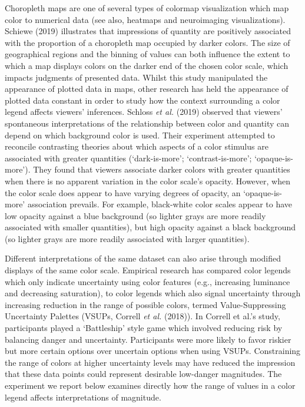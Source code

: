 \documentclass[
]{interact}
\begin{document}
Choropleth maps are one of several types of colormap visualization which
map color to numerical data (see also, heatmaps and neuroimaging
visualizations). Schiewe (2019) illustrates that impressions of quantity
are positively associated with the proportion of a choropleth map
occupied by darker colors. The size of geographical regions and the
binning of values can both influence the extent to which a map displays
colors on the darker end of the chosen color scale, which impacts
judgments of presented data. Whilst this study manipulated the
appearance of plotted data in maps, other research has held the
appearance of plotted data constant in order to study how the context
surrounding a color legend affects viewers' inferences. Schloss \emph{et
al.} (2019) observed that viewers' spontaneous interpretations of the
relationship between color and quantity can depend on which background
color is used. Their experiment attempted to reconcile contrasting
theories about which aspects of a color stimulus are associated with
greater quantities (`dark-is-more'; `contrast-is-more';
`opaque-is-more'). They found that viewers associate darker colors with
greater quantities when there is no apparent variation in the color
scale's opacity. However, when the color scale does appear to have
varying degrees of opacity, an `opaque-is-more' association prevails.
For example, black-white color scales appear to have low opacity against
a blue background (so lighter grays are more readily associated with
smaller quantities), but high opacity against a black background (so
lighter grays are more readily associated with larger quantities).

Different interpretations of the same dataset can also arise through
modified displays of the same color scale. Empirical research has
compared color legends which only indicate uncertainty using color
features (e.g., increasing luminance and decreasing saturation), to
color legends which also signal uncertainty through increasing reduction
in the range of possible colors, termed Value-Suppressing Uncertainty
Palettes (VSUPs, Correll \emph{et al.} (2018)). In Correll et al.'s
study, participants played a `Battleship' style game which involved
reducing risk by balancing danger and uncertainty. Participants were
more likely to favor riskier but more certain options over uncertain
options when using VSUPs. Constraining the range of colors at higher
uncertainty levels may have reduced the impression that these data
points could represent desirable low-danger magnitudes. The experiment
we report below examines directly how the range of values in a color
legend affects interpretations of magnitude.
\end{document}

